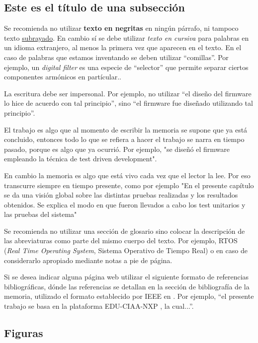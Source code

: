 \subsection{Este es el título de una subsección}
\label{subsec:ejemplo}

Se recomienda no utilizar \textbf{texto en negritas} en ningún párrafo, ni tampoco texto \underline{subrayado}. En cambio sí se debe utilizar \textit{texto en cursiva} para palabras en un idioma extranjero, al menos la primera vez que aparecen en el texto. En el caso de palabras que estamos inventando se deben utilizar ``comillas''. Por ejemplo, un \textit{digital filter} es una especie de ``selector'' que permite separar ciertos componentes armónicos en partícular..

La escritura debe ser impersonal. Por ejemplo, no utilizar ``el diseño del firmware lo hice de acuerdo con tal principio'', sino ``el firmware fue diseñado utilizando tal principio''. 

El trabajo es algo que al momento de escribir la memoria se supone que ya está concluido, entonces todo lo que se refiera a hacer el trabajo se narra en tiempo pasado, porque es algo que ya ocurrió. Por ejemplo, "se diseñó el firmware empleando la técnica de test driven development".

En cambio la memoria es algo que está vivo cada vez que el lector la lee. Por eso transcurre siempre en tiempo presente, como por ejemplo "En el presente capítulo se da una visión global sobre las distintas pruebas realizadas y los resultados obtenidos. Se explica el modo en que fueron llevados a cabo los test unitarios y las pruebas del sistema"

Se recomienda no utilizar una sección de glosario sino colocar la descripción de las abreviaturas como parte del mismo cuerpo del texto. Por ejemplo, RTOS (\textit{Real Time Operating System}, Sistema Operativo de Tiempo Real) o en caso de considerarlo apropiado mediante notas a pie de página.

Si se desea indicar alguna página web utilizar el siguiente formato de referencias bibliográficas, dónde las referencias se detallan en la sección de bibliografía de la memoria, utilizado el formato establecido por IEEE en \citep{IEEE:citation}. Por ejemplo, ``el presente trabajo se basa en la plataforma EDU-CIAA-NXP \citep{CIAA}, la cual...''.

\subsection{Figuras} 

